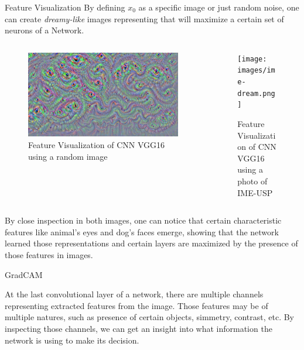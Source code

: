 \documentclass[final]{beamer}
\newlength{\colwidth}
\begin{document}
\begin{frame}[t]
\begin{columns}[t]
\begin{column}{\colwidth}
\begin{block}{Feature Visualization}
    By defining \(x_0\) as a specific image or just random noise, one can create \emph{dreamy-like} \cite{deepdream} images representing that will maximize a certain set of neurons of a Network.
    \begin{columns}  
      \begin{column}{0.5\textwidth}
        \begin{figure}
          \centering
          \includegraphics[width=\linewidth]{images/random_image_dream.png}
          \caption{Feature Visualization of CNN VGG16 using a random image}
        \end{figure}  
      \end{column}

      \begin{column}{0.5\textwidth}
        \begin{figure}
          \centering
          \texttt{[image: images/ime-dream.png]}
          \caption{Feature Visualization of CNN VGG16 using a photo of IME-USP}
        \end{figure}
      \end{column}
      
    \end{columns}

    By close inspection in both images, one can notice that certain characteristic features like animal's eyes and dog's faces emerge,
    showing that the network learned those representations and certain layers are maximized by the presence of those features in images.
  \end{block}

  \begin{block}{GradCAM}

    At the last convolutional layer of a network, there are multiple channels representing extracted features from the image. Those features may be of multiple natures, such as presence of certain objects, simmetry, contrast, etc. By inspecting those channels, we can get an insight into what information the network is using to make its decision.


\end{block}
\end{column}
\end{columns}
\end{frame}
\end{document}
